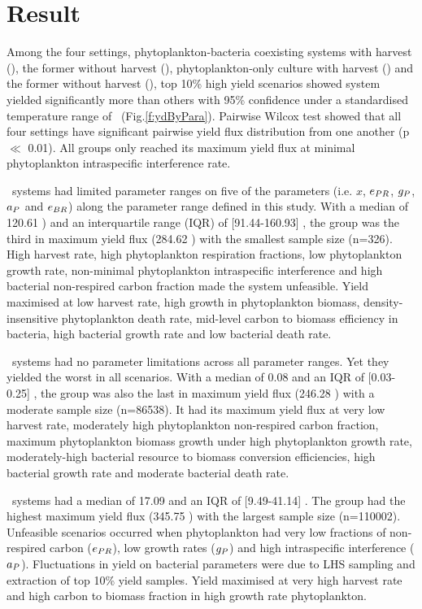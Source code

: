 \documentclass[../thesis.tex]{subfiles} %
\begin{document}
\section{Result}
Among the four settings, phytoplankton-bacteria coexisting systems with harvest (\PBH), the former without harvest (\PBN), phytoplankton-only culture with harvest (\PoH) and the former without harvest (\PoN), top 10\% high yield scenarios showed \PBH system yielded significantly more than others with 95\% confidence under a standardised temperature range of \temp\ (Fig.\ref{f:ydByPara}).  Pairwise Wilcox test showed that all four settings have significant pairwise yield flux distribution from one another (p $\ll$ 0.01).  All groups only reached its maximum yield flux at minimal phytoplankton intraspecific interference rate.

\PBH\ systems had limited parameter ranges on five of the parameters (i.e. $x$, $e_{PR}$, $g_P$, $a_P$ and $e_{BR}$) along the parameter range defined in this study.  With a median of 120.61 \dxdt) and an interquartile range (IQR) of [91.44-160.93] \dxdt, the group was the third in maximum yield flux (284.62 \dxdt) with the smallest sample size (n=326).  High harvest rate, high phytoplankton respiration fractions, low phytoplankton growth rate, non-minimal phytoplankton intraspecific interference and high bacterial non-respired carbon fraction made the system unfeasible.  Yield maximised at low harvest rate, high growth in phytoplankton biomass, density-insensitive phytoplankton death rate, mid-level carbon to biomass efficiency in bacteria, high bacterial growth rate and low bacterial death rate.

\PBN\ systems had no parameter limitations across all parameter ranges.  Yet they yielded the worst in all scenarios.  With a median of 0.08 \dxdt and an IQR of [0.03-0.25] \dxdt, the group was also the last in maximum yield flux (246.28 \dxdt) with a moderate sample size (n=86538).  It had its maximum yield flux at very low harvest rate, moderately high phytoplankton non-respired carbon fraction, maximum phytoplankton biomass growth under high phytoplankton growth rate, moderately-high bacterial resource to biomass conversion efficiencies, high bacterial growth rate and moderate bacterial death rate.  

\PoH\ systems had a median of 17.09 \dxdt and an IQR of [9.49-41.14] \dxdt.  The group had the highest maximum yield flux (345.75 \dxdt) with the largest sample size (n=110002).  Unfeasible scenarios occurred when phytoplankton had very low fractions of non-respired carbon ($e_{PR}$), low growth rates ($g_P$) and high intraspecific interference ($a_P$).  Fluctuations in yield on bacterial parameters were due to LHS sampling and extraction of top 10\% yield samples.  Yield maximised at very high harvest rate and high carbon to biomass fraction in high growth rate phytoplankton.
\end{document}
